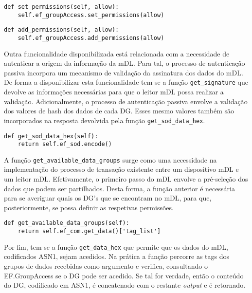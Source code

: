 \begin{Verbatim}[frame=single, framerule=0.5mm]
def set_permissions(self, allow):
	self.ef_groupAccess.set_permissions(allow)
\end{Verbatim}

\begin{Verbatim}[frame=single, framerule=0.5mm]
def add_permissions(self, allow):
	self.ef_groupAccess.add_permissions(allow)
\end{Verbatim}

Outra funcionalidade disponibilizada está relacionada com a necessidade de autenticar a origem da informação da mDL\@. Para tal, o processo de autenticação passiva incorpora um mecanismo de validação da assinatura dos dados do mDL\@. De forma a disponibilizar esta funcionalidade tem-se a função \texttt{get\_signature} que devolve as informações necessárias para que o leitor mDL possa realizar a validação. Adicionalmente, o processo de autenticação passiva envolve a validação dos valores de hash dos dados de cada DG\@. Esses mesmo valores também são incorporados na resposta devolvida pela função \texttt{get\_sod\_data\_hex}.

\begin{Verbatim}[frame=single, framerule=0.5mm]
def get_sod_data_hex(self):
    return self.ef_sod.encode()
\end{Verbatim}

A função \texttt{get\_available\_data\_groups} surge como uma necessidade na implementação do processo de transação existente entre um dispositivo mDL e um leitor mDL\@. Efetivamente, o primeiro passo do mDL envolve a pré-seleção dos dados que podem ser partilhados. Desta forma, a função anterior é necessária para se averiguar quais os DG's que se encontram no mDL, para que, posteriormente, se possa definir as respetivas permissões.

\begin{Verbatim}[frame=single, framerule=0.5mm]
def get_available_data_groups(self):
	return self.ef_com.get_data()['tag_list']
\end{Verbatim}

Por fim, tem-se a função \texttt{get\_data\_hex} que permite que os dados do mDL, codificados ASN1, sejam acedidos. Na prática a função percorre as tags dos grupos de dados recebidas como argumento e verifica, consultando o EF.GroupAccess se o DG pode ser acedido. Se tal for verdade, então o conteúdo do DG, codificado em ASN1, é concatenado com o restante \textit{output} e é retornado.

